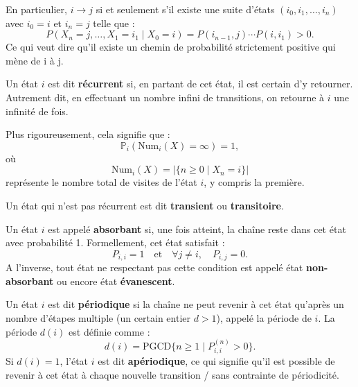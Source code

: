 \documentclass{article}
\begin{document}
En particulier, $i \to j$ si et seulement s'il existe une suite d'états $(i_0, i_1, \dots, i_n)$ avec $i_0 = i$ et $i_n = j$ telle que :
\[
P(X_n = j, \dots, X_1 = i_1 \mid X_0 = i) = P(i_{n-1}, j) \cdots P(i, i_1) > 0.
\]
Ce qui veut dire qu'il existe un chemin de probabilité strictement positive qui mène de i à j.

\begin{tcolorbox}[colback=white,colframe=blue!80!black,title=État récurrent/transitoire]
Un état $i$ est dit \textbf{récurrent} si, en partant de cet état, il est certain d'y retourner.
Autrement dit, en effectuant un nombre infini de transitions, on retourne à $i$ une infinité de fois.

Plus rigoureusement, cela signifie que :
\[
\mathbb{P}_i(\text{Num}_i(X) = \infty) = 1,
\]
où  
\[
\text{Num}_i(X) = |\{n \geq 0 \mid X_n = i\}|
\]
représente le nombre total de visites de l'état $i$, y compris la première.

Un état qui n'est pas récurrent est dit \textbf{transient} ou \textbf{transitoire}.
\end{tcolorbox}

\begin{tcolorbox}[colback=white,colframe=blue!80!black,title=État absorbant/évanescent]
Un état $i$ est appelé \textbf{absorbant} si, une fois atteint, la chaîne reste dans cet état avec probabilité 1. Formellement, cet état satisfait :
\[
P_{i,i} = 1 \quad \text{et} \quad \forall j \neq i, \quad P_{i,j} = 0.
\]
A l'inverse, tout état ne respectant pas cette condition est appelé état \textbf{non-absorbant} ou encore état \textbf{évanescent}.
\end{tcolorbox}

\begin{tcolorbox}[colback=white,colframe=blue!80!black,title=État périodique/apériodique]
Un état $i$ est dit \textbf{périodique} si la chaîne ne peut revenir à cet état qu'après un nombre d'étapes multiple (un certain entier $d > 1$), appelé la période de $i$. La période $d(i)$ est définie comme :
\[
d(i) = \text{PGCD}\{n \geq 1 \mid P_{i,i}^{(n)} > 0\}.
\]
Si $d(i) = 1$, l'état $i$ est dit \textbf{apériodique}, ce qui signifie qu'il est possible de revenir à cet état à chaque nouvelle transition /  sans contrainte de périodicité.
\end{tcolorbox}

\end{document}
